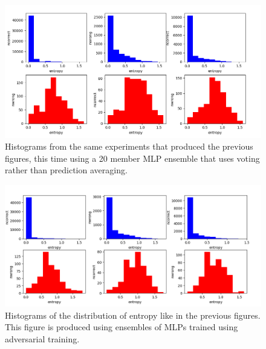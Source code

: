 \begin{figure}
    \centering
    \includegraphics[scale=0.6]{figure/EntropyFrekEnsembleVote.png}
    \caption{Histograms from the same experiments that produced the previous figures, this time using a 20 member MLP ensemble that uses voting rather than prediction averaging.}
    \label{fig:hist3vote}
\end{figure}

\begin{figure}
    \centering
    \includegraphics[scale=0.6]{figure/EntropyFrekIndividualAT.png}
    \caption{Histograms of the distribution of entropy like in the previous figures. This figure is produced using ensembles of MLPs trained using adversarial training.}
    \label{fig:hist3at}
\end{figure}


